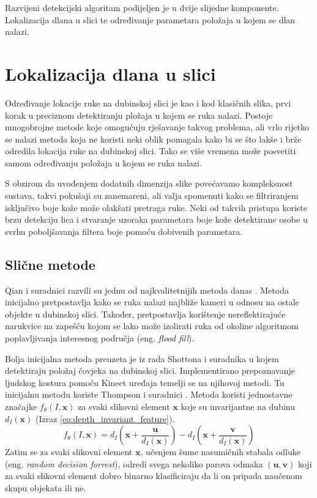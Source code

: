 \documentclass[times, utf8, diplomski, numeric]{fer}
\begin{document}
Razvijeni detekcijski algoritam podijeljen je u dvije slijedne komponente. Lokalizacija dlana u slici te određivanje parametara položaja u kojem se dlan nalazi.

\section{Lokalizacija dlana u slici}
Određivanje lokacije ruke na dubinskoj slici je kao i kod klasičnih slika, prvi korak u preciznom detektiranju pložaja u kojem se ruka nalazi. Postoje mnogobrojne metode koje omogućuju rješavanje takvog problema, ali vrlo rijetko se nalazi metoda koja ne koristi neki oblik pomagala kako bi se što lakše i brže odredila lokacija ruke na dubinskoj slici. Tako se više vremena može posvetiti samom određivanju položaja u kojem se ruka nalazi.

S obzirom da uvođenjem dodatnih dimenzija slike povećavamo kompleksnost sustava, takvi pokušaji su zanemareni, ali valja spomenuti kako se filtriranjem isključivo boje kože može olakšati pretraga ruke. Neki od takvih pristupa koriste brzu detekciju lica i stvaranje uzoraka parametara boje kože detektirane osobe u svrhu poboljšavanja filtera boje pomoću dobivenih parametara.

\subsection{Slične metode}
Qian i suradnici razvili su jednu od najkvalitetnijih metoda danas \cite{qian2014realtime}. Metoda inicijalno pretpostavlja kako se ruka nalazi najbliže kameri u odnosu na ostale objekte u dubinskoj slici. Također, pretpostavlja korištenje nereflektirajuće narukvice na zapešću kojom se lako može izolirati ruka od okoline algoritmom poplavljivanja interesnog područja (eng. \textit{flood fill}).

Bolja inicijalna metoda preuzeta je iz rada Shottona i suradnika \cite{shotton2013real} u kojem detektiraju položaj čovjeka na dubinskoj slici. Implementirano prepoznavanje ljudskog kostura pomoću Kinect uređaja temelji se na njihovoj metodi. Tu inicijalnu metodu koriste Thompson i suradnici \cite{tompson2014real}. Metoda koristi jednostavne značajke $f_{\theta}(I,\mathbf{x})$ za svaki slikovni element $\mathbf{x}$ koje su invarijantne na dubinu $d_{I}(\mathbf{x}) $ (Izraz \ref{eq:depth_invariant_feature}).
\begin{equation}\label{eq:depth_invariant_feature}
f_{\theta}(I,\mathbf{x})=d_{I}(\mathbf{x}+ \frac{\mathbf{u}}{d_{I}(\mathbf{x})})-d_{I}(\mathbf{x}+ \frac{\mathbf{v}}{d_{I}(\mathbf{x})})\end{equation}
Zatim se za svaki slikovni element $\mathbf{x}$, učenjem šume nasumičnih stabala odluke (eng. \textit{random decision forrest}), odredi svega nekoliko parova odmaka $(\mathbf{u},\mathbf{v})$ koji za svaki slikovni element dobro binarno klasificiraju da li on pripada naučenom skupu objekata ili ne.
\end{document}
